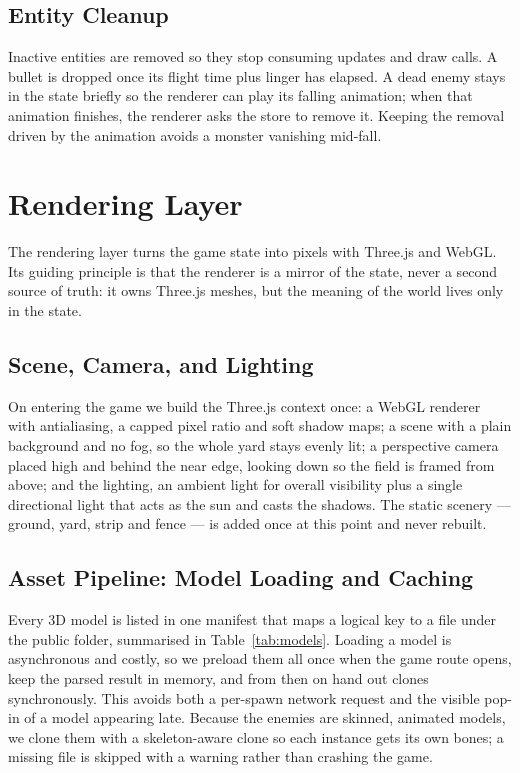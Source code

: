 \documentclass[12pt,a4paper]{report}
\begin{document}
\subsection{Entity Cleanup}

Inactive entities are removed so they stop consuming updates and draw calls. A
bullet is dropped once its flight time plus linger has elapsed. A dead enemy
stays in the state briefly so the renderer can play its falling animation; when
that animation finishes, the renderer asks the store to remove it. Keeping the
removal driven by the animation avoids a monster vanishing mid-fall.

\section{Rendering Layer}

The rendering layer turns the game state into pixels with Three.js and WebGL.
Its guiding principle is that the renderer is a mirror of the state, never a
second source of truth: it owns Three.js meshes, but the meaning of the world
lives only in the state.

\subsection{Scene, Camera, and Lighting}

On entering the game we build the Three.js context once: a WebGL renderer with
antialiasing, a capped pixel ratio and soft shadow maps; a scene with a plain
background and no fog, so the whole yard stays evenly lit; a perspective camera
placed high and behind the near edge, looking down so the field is framed from
above; and the lighting, an ambient light for overall visibility plus a single
directional light that acts as the sun and casts the shadows. The static scenery
--- ground, yard, strip and fence --- is added once at this point and never
rebuilt.

\subsection{Asset Pipeline: Model Loading and Caching}

Every 3D model is listed in one manifest that maps a logical key to a file under
the public folder, summarised in Table~\ref{tab:models}. Loading a model is
asynchronous and costly, so we preload them all once when the game route opens,
keep the parsed result in memory, and from then on hand out clones synchronously.
This avoids both a per-spawn network request and the visible pop-in of a model
appearing late. Because the enemies are skinned, animated models, we clone them
with a skeleton-aware clone so each instance gets its own bones; a missing file
is skipped with a warning rather than crashing the game.
\end{document}
